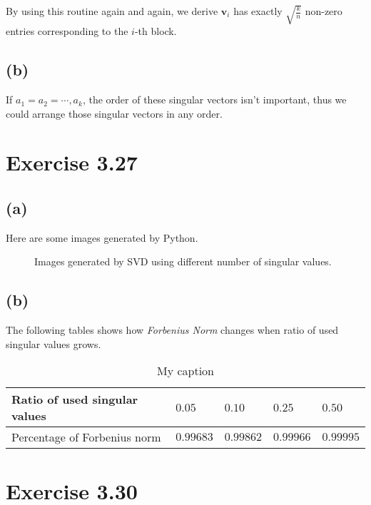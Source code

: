 \documentclass[paper=a4, fontsize=11pt]{scrartcl} %
\numberwithin{equation}{section} %
\numberwithin{figure}{section} %
\numberwithin{table}{section} %
\begin{document}
By using this routine again and again, we derive $\mathbf{v}_i$ has exactly $\sqrt{\frac{k}{n}}$ non-zero entries corresponding to the $i$-th block.

\subsection*{(b)}
If $a_1 = a_2 = \cdots, a_k$, the order of these singular vectors isn't important, thus we could arrange those singular vectors in any order. 

\section*{Exercise 3.27}
\subsection*{(a)}
Here are some images generated by Python.
\begin{figure}[H]
	\centering



	\caption{Images generated by SVD using different number of singular values.}
\end{figure}
\subsection*{(b)}
The following tables shows how {\it Forbenius Norm} changes when ratio of used singular values grows.
	\begin{table}[!htb]
		\centering
		\caption{My caption}
		\label{my-label}
		\begin{tabular}{|l|l|l|l|l|}
			\hline
			Ratio of used singular values     & $0.05$           & $0.10$           & $0.25$          & $0.50$   \\       
			\hline
			Percentage of Forbenius norm & $0.99683$ & $0.99862$ & $0.99966$ & $0.99995$            \\
			\hline
		\end{tabular}
	\end{table}

\section*{Exercise 3.30}
\end{document}
